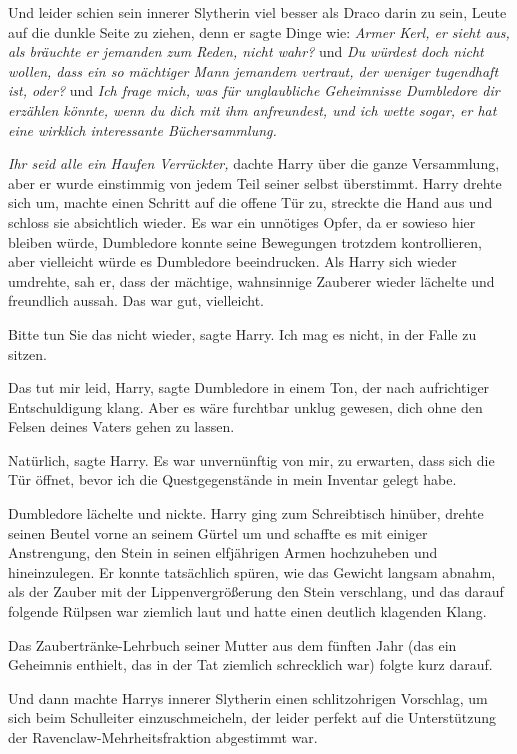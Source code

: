 Und leider schien sein innerer Slytherin viel besser als Draco darin zu sein,
Leute auf die dunkle Seite zu ziehen, denn er sagte Dinge wie: \glqq \emph{Armer
Kerl, er sieht aus, als bräuchte er jemanden zum Reden, nicht wahr?\grqq{} } und
\emph{\glqq Du würdest doch nicht wollen, dass ein so mächtiger Mann jemandem
vertraut, der weniger tugendhaft ist, oder?\grqq{} } und \emph{\glqq Ich frage
mich, was für unglaubliche Geheimnisse Dumbledore dir erzählen könnte, wenn du
dich mit ihm anfreundest, und ich wette sogar, er hat eine wirklich interessante
Büchersammlung.}

\emph{Ihr seid alle ein Haufen Verrückter, }dachte Harry über die ganze
Versammlung, aber er wurde einstimmig von jedem Teil seiner selbst überstimmt.
Harry drehte sich um, machte einen Schritt auf die offene Tür zu, streckte die
Hand aus und schloss sie absichtlich wieder. Es war ein unnötiges Opfer, da er
sowieso hier bleiben würde, Dumbledore konnte seine Bewegungen trotzdem
kontrollieren, aber vielleicht würde es Dumbledore beeindrucken. Als Harry sich
wieder umdrehte, sah er, dass der mächtige, wahnsinnige Zauberer wieder lächelte
und freundlich aussah. Das war gut, vielleicht.

\glqq Bitte tun Sie das nicht wieder\grqq{}, sagte Harry. \glqq Ich mag es
nicht, in der Falle zu sitzen.\grqq{}

\glqq Das tut mir leid, Harry\grqq{}, sagte Dumbledore in einem Ton, der nach
aufrichtiger Entschuldigung klang. \glqq Aber es wäre furchtbar unklug gewesen,
dich ohne den Felsen deines Vaters gehen zu lassen.\grqq{}

\glqq Natürlich\grqq{}, sagte Harry. \glqq Es war unvernünftig von mir, zu
erwarten, dass sich die Tür öffnet, bevor ich die Questgegenstände in mein
Inventar gelegt habe.\grqq{}

Dumbledore lächelte und nickte. Harry ging zum Schreibtisch hinüber, drehte
seinen Beutel vorne an seinem Gürtel um und schaffte es mit einiger Anstrengung,
den Stein in seinen elfjährigen Armen hochzuheben und hineinzulegen. Er konnte
tatsächlich spüren, wie das Gewicht langsam abnahm, als der Zauber mit der
Lippenvergrößerung den Stein verschlang, und das darauf folgende Rülpsen war
ziemlich laut und hatte einen deutlich klagenden Klang.

Das Zaubertränke-Lehrbuch seiner Mutter aus dem fünften Jahr (das ein Geheimnis
enthielt, das in der Tat ziemlich schrecklich war) folgte kurz darauf.

Und dann machte Harrys innerer Slytherin einen schlitzohrigen Vorschlag, um sich
beim Schulleiter einzuschmeicheln, der leider perfekt auf die Unterstützung der
Ravenclaw-Mehrheitsfraktion abgestimmt war.

